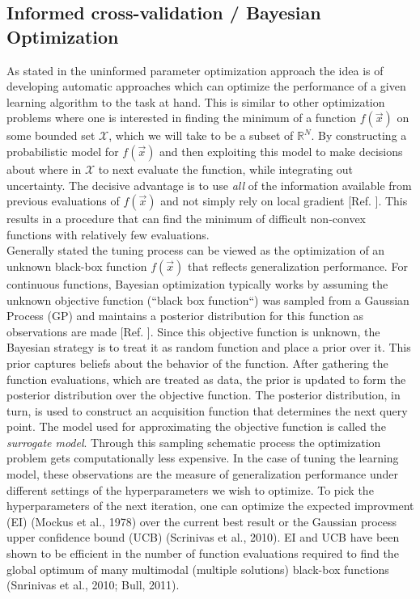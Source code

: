 \documentclass[12pt, a4paper]{article}
\begin{document}
\subsection{Informed cross-validation / Bayesian Optimization}
\label{sec: bayesian_opt}
As stated in the uninformed parameter optimization approach the idea is of developing automatic approaches which can optimize the performance of a given learning algorithm to the task at hand. This is similar to other optimization problems where one is interested in finding the minimum of a function $f(\vec{x})$ on some bounded set $\mathcal{X}$, which we will take to be a subset of $\mathbb{R}^N$. By constructing a probabilistic model for $f(\vec{x})$ and then exploiting this model to make decisions about where in $\mathcal{X}$ to next evaluate the function, while integrating out uncertainty.
The decisive advantage is to use \textit{all} of the information available from previous evaluations of $f(\vec{x})$ and not simply rely on local gradient [Ref. \cite{Snoek2012}]. This results in a procedure that can find the minimum of difficult non-convex functions with relatively few evaluations. \\
Generally stated the tuning process can be viewed as the optimization of an unknown black-box function $f(\vec{x})$ that reflects generalization performance. For continuous functions, Bayesian optimization typically works by assuming the unknown objective function (``black box function``) was sampled from a Gaussian Process (GP) and maintains a posterior distribution for this function as observations are made [Ref. \cite{Frazier2018}]. 
Since this objective function is unknown, the Bayesian strategy is to treat it as random function and place a prior over it. This prior captures beliefs about the behavior of the function. After gathering the function evaluations, which are treated as data, the prior is updated to form the posterior distribution over the objective function. The posterior distribution, in turn, is used to construct an acquisition function that determines the next query point. The model used for approximating the objective function is called the \textit{surrogate model}.
Through this sampling schematic process the optimization problem gets computationally less expensive.
In the case of tuning the learning model, these observations are the measure of generalization performance under different settings of the hyperparameters we wish to optimize. To pick the hyperparameters of the next iteration, one can optimize the expected improvment (EI) (Mockus et al., 1978) over the current best result or the Gaussian process upper confidence bound (UCB) (Scrinivas et al., 2010). EI and UCB have been shown to be efficient in the number of function evaluations required to find the global optimum of many multimodal (multiple solutions) black-box functions (Snrinivas et al., 2010; Bull, 2011).
\end{document}
